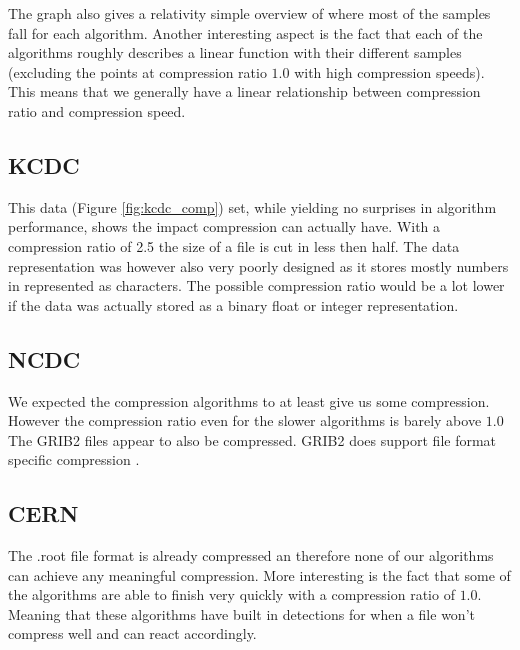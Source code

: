 \documentclass[
	12pt,
	a4paper,
	BCOR10mm,
	DIV14,
	listof=totoc,
	bibliography=totoc,
	headsepline
]{scrreprt}
\begin{document}
The graph also gives a relativity simple overview of where most of the samples fall for each algorithm.
Another interesting aspect is the fact that each of the algorithms roughly describes a linear function with their different samples (excluding the points at compression ratio $1.0$ with high compression speeds).
This means that we generally have a linear relationship between compression ratio and compression speed.
\FloatBarrier





\subsection{KCDC}


This data (Figure \ref{fig:kcdc_comp}) set, while yielding no surprises in algorithm performance, shows the impact compression can actually have. With a compression ratio of 2.5 the size of a file is cut in less then half.
The data representation was however also very poorly designed as it stores mostly numbers in represented as characters.
The possible compression ratio would be a lot lower if the data was actually stored as a binary float or integer representation.





\FloatBarrier
\subsection{NCDC}


We expected the compression algorithms to at least give us some compression.
However the compression ratio even for the slower algorithms is barely above $1.0$
The GRIB2 files appear to also be compressed. GRIB2 does support file format specific compression \cite{GRIMP}.





\FloatBarrier
\subsection{CERN}



The .root file format is already compressed an therefore none of our algorithms can achieve any meaningful compression. More interesting is the fact that some of the algorithms are able to finish very quickly with a compression ratio of $1.0$.
Meaning that these algorithms have built in detections for when a file won't compress well and can react accordingly.
\FloatBarrier
\end{document}

